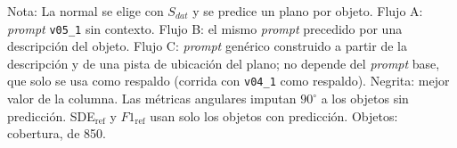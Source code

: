 \begin{table}[htbp]
\vspace{1.5ex}
\begin{minipage}{\wd\tablebox}
\footnotesize
Nota: La normal se elige con $S_{dat}$ y se predice un plano por objeto. Flujo A: \textit{prompt} \texttt{v05\_1} sin contexto. Flujo B: el mismo \textit{prompt} precedido por una descripción del objeto. Flujo C: \textit{prompt} genérico construido a partir de la descripción y de una pista de ubicación del plano; no depende del \textit{prompt} base, que solo se usa como respaldo (corrida con \texttt{v04\_1} como respaldo). Negrita: mejor valor de la columna. Las métricas angulares imputan $90^\circ$ a los objetos sin predicción. SDE$_{\mathrm{ref}}$ y $F1_{\mathrm{ref}}$ usan solo los objetos con predicción. Objetos: cobertura, de 850.
\end{minipage}
\end{table}

\clearpage


